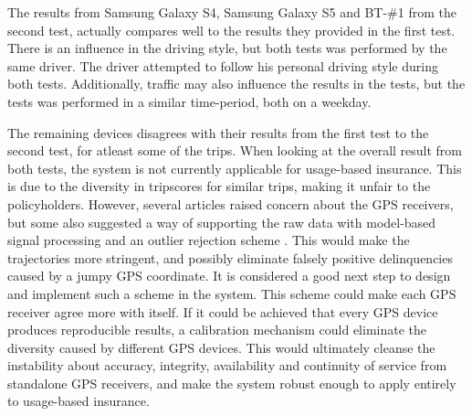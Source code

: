 The results from Samsung Galaxy S4, Samsung Galaxy S5 and BT-\#1 from the second test, actually compares well to the results they provided in the first test. There is an influence in the driving style, but both tests was performed by the same driver. The driver attempted to follow his personal driving style during both tests. Additionally, traffic may also influence the results in the tests, but the tests was performed in a similar time-period, both on a weekday. 

The remaining devices disagrees with their results from the first test to the second test, for atleast some of the trips. When looking at the overall result from both tests, the system is not currently applicable for usage-based insurance. This is due to the diversity in tripscores for similar trips, making it unfair to the policyholders. However, several articles raised concern about the GPS receivers, but some also suggested a way of supporting the raw data with model-based signal processing and an outlier rejection scheme \citep{art:challenges_smartphone_ubi} \citep{art:smartphones_for_monitoring_and_ubi} \citep{art:insurtelematics}. This would make the trajectories more stringent, and possibly eliminate falsely positive delinquencies caused by a jumpy GPS coordinate. It is considered a good next step to design and implement such a scheme in the system. This scheme could make each GPS receiver agree more with itself. If it could be achieved that every GPS device produces reproducible results, a calibration mechanism could eliminate the diversity caused by different GPS devices. This would ultimately cleanse the instability about accuracy, integrity, availability and continuity of service from standalone GPS receivers, and make the system robust enough to apply entirely to usage-based insurance.



